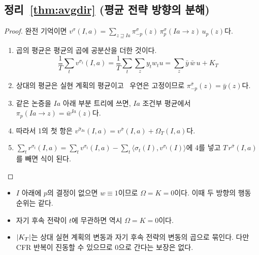 \subsection{정리~\ref{thm:avgdir} (평균 전략 방향의 분해)}
\begin{proof}
완전 기억이면 $v^\sigma(I,a)=\sum_{z\sqsupseteq Ia}\pi^\sigma_{-p}(z)\,\pi_p^\sigma(Ia\to z)\,u_p(z)$다.
\begin{enumerate}
  \item 곱의 평균은 평균의 곱에 공분산을 더한 것이다.
    \[
    \frac1T\sum_tv^{\sigma_t}(I,a)=\frac1T\sum_t\sum_zy_tw_tu=\sum_z\bar y\,\bar w\,u+K_T
    \]
  \item 상대의 평균은 실현 계획의 평균이고~\citep{vonstengel1996efficient} 우연은 고정이므로 $\pi^{\bar\sigma}_{-p}(z)=\bar y(z)$다.
  \item 같은 논증을 $Ia$ 아래 부분 트리에 쓰면, $Ia$ 조건부 평균에서 $\pi_p(Ia\to z)=\bar w^{Ia}(z)$다.
  \item 따라서 1의 첫 항은 $v^{\hat\sigma_{Ia}}(I,a)=v^{\bar\sigma}(I,a)+\Omega_T(I,a)$다.
  \item $\sum_tr^{\sigma_t}(I,a)=\sum_tv^{\sigma_t}(I,a)-\sum_t\langle\sigma_t(I),v^{\sigma_t}(I)\rangle$에 4를 넣고 $T\,r^{\bar\sigma}(I,a)$를 빼면 식이 된다.
\end{enumerate}
\end{proof}
\begin{itemize}
  \item $I$ 아래에 $p$의 결정이 없으면 $w\equiv1$이므로 $\Omega=K=0$이다. 이때 두 방향의 행동 순위는 같다.
  \item 자기 후속 전략이 $t$에 무관하면 역시 $\Omega=K=0$이다.
  \item $\left\lvert K_T\right\rvert$는 상대 실현 계획의 변동과 자기 후속 전략의 변동의 곱으로 묶인다. 다만 CFR 반복이 진동할 수 있으므로 0으로 간다는 보장은 없다.
\end{itemize}
